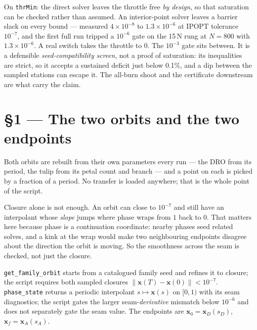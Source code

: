 \documentclass[11pt]{article}
\newcommand{\file}[1]{\texttt{#1}}
\newcommand{\sD}{s_D}\newcommand{\sA}{s_A}
\begin{document}
\begin{warn}
On \file{thrMin}: the direct solver leaves the throttle free \emph{by
design}, so that saturation can be checked rather than assumed. An
interior-point solver leaves a barrier slack on every bound --- measured
$4\times10^{-8}$ to $1.3\times10^{-6}$ at IPOPT tolerance $10^{-7}$, and the
first full run tripped a $10^{-6}$ gate on the 15\,N rung at $N=800$ with
$1.3\times10^{-6}$. A real switch takes the throttle to 0. The $10^{-3}$
gate sits between. It is a defensible \emph{seed-compatibility screen},
not a proof of saturation: its inequalities are strict, so it accepts a
sustained deficit just below 0.1\%, and a dip between the sampled stations
can escape it. The all-burn shoot and the certificate downstream are what
carry the claim.
\end{warn}

\section{\S1 --- The two orbits and the two endpoints}\label{sec:orbits}

\begin{eli}
Both orbits are rebuilt from their own parameters every run --- the DRO from
its period, the tulip from its petal count and branch --- and a point on each
is picked by a fraction of a period. No transfer is loaded anywhere; that is
the whole point of the script.
\end{eli}

\begin{intu}
Closure alone is not enough. An orbit can close to $10^{-7}$ and still have
an interpolant whose \emph{slope} jumps where phase wraps from $1$ back to
$0$. That matters here because phase is a continuation coordinate: nearby
phases seed related solves, and a kink at the wrap would make two
neighbouring endpoints disagree about the direction the orbit is moving.
So the smoothness across the seam is checked, not just the closure.
\end{intu}

\begin{rig}
\file{get\_family\_orbit} starts from a catalogued family seed and refines
it to closure; the script requires both sampled closures
$\|\bm x(T)-\bm x(0)\|<10^{-7}$. \file{phase\_state} returns a periodic
interpolant $s\mapsto\bm x(s)$ on $[0,1)$ with its seam diagnostics; the
script gates the larger seam-\emph{derivative} mismatch below $10^{-6}$
and does not separately gate the seam value. The endpoints are
$\bm x_0=\bm x_D(\sD)$, $\bm x_f=\bm x_A(\sA)$.
\end{rig}
\end{document}
